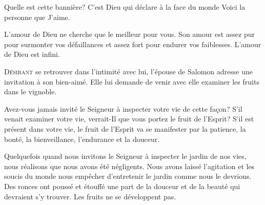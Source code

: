 Quelle est cette bannière?
 C'est Dieu qui déclare à la face du monde\frcolon{} 
 \Og Voici la personne que J'aime. \Fg{}



L'amour de Dieu ne cherche que le meilleur pour vous.
 Son amour est assez pur pour surmonter vos défaillances
 et assez fort pour endurer vos faiblesses.
 L'amour de Dieu est infini. 

\dvrule






\lettrine{D}{ésirant} se retrouver dans l'intimité avec lui,
 l'épouse de Salomon adresse une invitation à son bien-aimé.
 Elle lui demande de venir avec elle examiner les fruits dans le vignoble.

Avez-vous jamais invité le Seigneur à inspecter votre vie de cette fa\c{c}on?
 S'il venait examiner votre vie, verrait-Il que vous portez
 le fruit de l'Esprit? S'il est présent dans votre vie,
 le fruit de l'Esprit va se manifester par la patience, la bonté,
 la bienveillance, l'endurance et la douceur.


Quelquefois quand nous invitons le Seigneur à inspecter le jardin de nos vies,
 nous réalisons que nous avons été négligents.
 Nous avons laissé l'agitation et les soucis du monde nous empêcher
 d'entretenir le jardin comme nous le devrions.
 Des ronces ont poussé et étouffé une part de la douceur et de la beauté
 qui devraient s'y trouver. Les fruits ne se développent pas.


